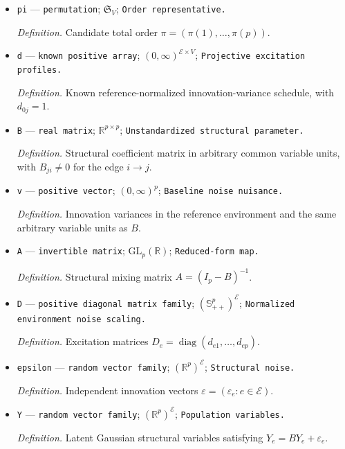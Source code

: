 \documentclass{article}
\begin{document}
\begin{itemize}
  \par\smallskip\noindent\emph{Definition.} \texttt{Generic recursion-\allowbreak{}stage index.}
  \item \texttt{pi} --- \texttt{permutation}; \(\mathfrak S_V\); \texttt{Order representative.}
  \par\smallskip\noindent\emph{Definition.} Candidate total order \(\pi=(\pi(1),\ldots,\pi(p))\).
  \item \texttt{d} --- \texttt{known positive array}; \((0,\infty)^{\mathcal E\times V}\); \texttt{Projective excitation profiles.}
  \par\smallskip\noindent\emph{Definition.} Known reference-normalized innovation-variance schedule, with \(d_{0j}=1\).
  \item \texttt{B} --- \texttt{real matrix}; \(\mathbb R^{p\times p}\); \texttt{Unstandardized structural parameter.}
  \par\smallskip\noindent\emph{Definition.} Structural coefficient matrix in arbitrary common variable units, with \(B_{ji}\ne0\) for the edge \(i\to j\).
  \item \texttt{v} --- \texttt{positive vector}; \((0,\infty)^p\); \texttt{Baseline noise nuisance.}
  \par\smallskip\noindent\emph{Definition.} Innovation variances in the reference environment and the same arbitrary variable units as \(B\).
  \item \texttt{A} --- \texttt{invertible matrix}; \(\mathrm{GL}_p(\mathbb R)\); \texttt{Reduced-\allowbreak{}form map.}
  \par\smallskip\noindent\emph{Definition.} Structural mixing matrix \(A=(I_p-B)^{-1}\).
  \item \texttt{D} --- \texttt{positive diagonal matrix family}; \((\mathbb S_{++}^{p})^{\mathcal E}\); \texttt{Normalized environment noise scaling.}
  \par\smallskip\noindent\emph{Definition.} Excitation matrices \(D_e=\operatorname{diag}(d_{e1},\ldots,d_{ep})\).
  \item \texttt{epsilon} --- \texttt{random vector family}; \((\mathbb R^p)^{\mathcal E}\); \texttt{Structural noise.}
  \par\smallskip\noindent\emph{Definition.} Independent innovation vectors \(\varepsilon=(\varepsilon_e:e\in\mathcal E)\).
  \item \texttt{Y} --- \texttt{random vector family}; \((\mathbb R^p)^{\mathcal E}\); \texttt{Population variables.}
  \par\smallskip\noindent\emph{Definition.} Latent Gaussian structural variables satisfying \(Y_e=BY_e+\varepsilon_e\).

\end{itemize}
\end{document}
